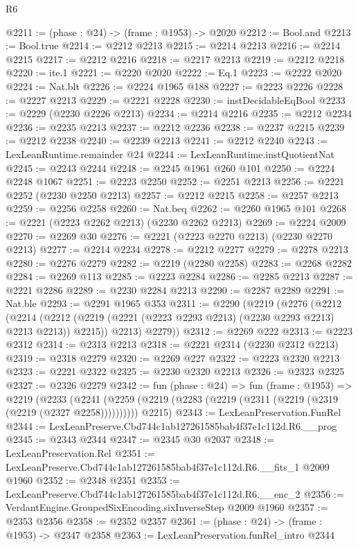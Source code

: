 \begin{lexlean}{R6}
\begin{coremodule}
@2211 := (phase : @24) -> (frame : @1953) -> @2020
@2212 := Bool.and
@2213 := Bool.true
@2214 := @2212 @2213
@2215 := @2214 @2213
@2216 := @2214 @2215
@2217 := @2212 @2216
@2218 := @2217 @2213
@2219 := @2212 @2218
@2220 := ite.{1}
@2221 := @2220 @2020
@2222 := Eq.{1}
@2223 := @2222 @2020
@2224 := Nat.blt
@2226 := @2224 @1965 @188
@2227 := @2223 @2226
@2228 := @2227 @2213
@2229 := @2221 @2228
@2230 := instDecidableEqBool
@2233 := @2229 (@2230 @2226 @2213)
@2234 := @2214 @2216
@2235 := @2212 @2234
@2236 := @2235 @2213
@2237 := @2212 @2236
@2238 := @2237 @2215
@2239 := @2212 @2238
@2240 := @2239 @2213
@2241 := @2212 @2240
@2243 := LexLeanRuntime.remainder @24
@2244 := LexLeanRuntime.instQuotientNat
@2245 := @2243 @2244
@2248 := @2245 @1961 @260 @101
@2250 := @2224 @2248 @1067
@2251 := @2223 @2250
@2252 := @2251 @2213
@2256 := @2221 @2252 (@2230 @2250 @2213)
@2257 := @2212 @2215
@2258 := @2257 @2213
@2259 := @2256 @2258
@2260 := Nat.beq
@2262 := @2260 @1965 @101
@2268 := @2221 (@2223 @2262 @2213) (@2230 @2262 @2213)
@2269 := @2224 @2009
@2270 := @2269 @30
@2276 := @2221 (@2223 @2270 @2213) (@2230 @2270 @2213)
@2277 := @2214 @2234
@2278 := @2212 @2277
@2279 := @2278 @2213
@2280 := @2276 @2279
@2282 := @2219 (@2280 @2258)
@2283 := @2268 @2282
@2284 := @2269 @113
@2285 := @2223 @2284
@2286 := @2285 @2213
@2287 := @2221 @2286
@2289 := @2230 @2284 @2213
@2290 := @2287 @2289
@2291 := Nat.ble
@2293 := @2291 @1965 @353
@2311 := @2290
    (@2219
      (@2276
        (@2212
          (@2214 (@2212 (@2219 (@2221 (@2223 @2293 @2213) (@2230 @2293 @2213) @2213 @2213)) @2215))
          @2213)
        @2279))
@2312 := @2269 @222
@2313 := @2223 @2312
@2314 := @2313 @2213
@2318 := @2221 @2314 (@2230 @2312 @2213)
@2319 := @2318 @2279
@2320 := @2269 @227
@2322 := @2223 @2320 @2213
@2323 := @2221 @2322
@2325 := @2230 @2320 @2213
@2326 := @2323 @2325
@2327 := @2326 @2279
@2342 := fun (phase : @24) =>
  fun (frame : @1953) =>
  @2219
    (@2233
      (@2241 (@2259 (@2219 (@2283 (@2219 (@2311 (@2219 (@2319 (@2219 (@2327 @2258))))))))))
      @2215)
@2343 := LexLeanPreservation.FunRel
@2344 := LexLeanPreserve.Cbd744c1ab127261585bab4f37e1c112d.R6.__prog
@2345 := @2343 @2344
@2347 := @2345 @30 @2037
@2348 := LexLeanPreservation.Rel
@2351 := LexLeanPreserve.Cbd744c1ab127261585bab4f37e1c112d.R6.__fits_1 @2009 @1960
@2352 := @2348 @2351
@2353 := LexLeanPreserve.Cbd744c1ab127261585bab4f37e1c112d.R6.__enc_2
@2356 := VerdantEngine.GroupedSixEncoding.sixInverseStep @2009 @1960
@2357 := @2353 @2356
@2358 := @2352 @2357
@2361 := (phase : @24) -> (frame : @1953) -> @2347 @2358
@2363 := LexLeanPreservation.funRel_intro @2344

\end{coremodule}
\end{lexlean}
